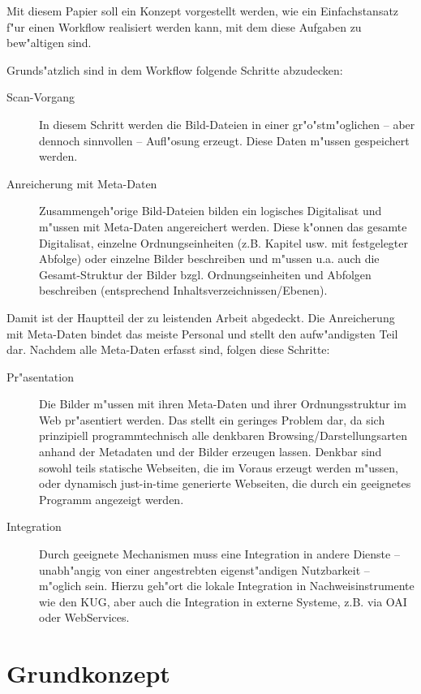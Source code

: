 \documentclass[11pt, twoside, a4paper, BCOR8mm, DIV12, bibtotoc,idxtotoc]{scrreprt}
\begin{document}
Mit diesem Papier soll ein Konzept vorgestellt werden, wie ein
Einfachstansatz f"ur einen Workflow realisiert werden kann, mit dem
diese Aufgaben zu bew"altigen sind.

Grunds"atzlich sind in dem Workflow folgende Schritte abzudecken:
\begin{description}
\item[Scan-Vorgang] In diesem Schritt werden die
  Bild-Dateien in einer gr"o"stm"oglichen -- aber dennoch sinnvollen
  -- Aufl"osung erzeugt. Diese Daten m"ussen gespeichert werden.
\item[Anreicherung mit Meta-Daten] Zusammengeh"orige Bild-Dateien
  bilden ein logisches Digitalisat und m"ussen mit Meta-Daten
  angereichert werden.  Diese k"onnen das gesamte Digitalisat,
  einzelne Ordnungs\-einheiten (z.B. Kapitel usw. mit festgelegter
  Abfolge) oder einzelne Bilder beschreiben und m"ussen u.a. auch die
  Gesamt-Struktur der Bilder bzgl.  Ordnungseinheiten und Abfolgen
  beschreiben (entsprechend Inhaltsverzeichnissen/Ebe\-nen).
\end{description}

Damit ist der Hauptteil der zu leistenden Arbeit abgedeckt. Die
Anreicherung mit Meta-Daten bindet das meiste Personal und stellt den
aufw"andigsten Teil dar. Nachdem alle Meta-Daten erfasst sind, folgen
diese Schritte:
\begin{description}
\item[Pr"asentation] Die Bilder m"ussen mit ihren Meta-Daten und ihrer
  Ordnungsstruktur im Web pr"asentiert werden. Das stellt ein geringes
  Problem dar, da sich prinzipiell programm\-tech\-nisch alle denkbaren
  Browsing/Darstellungsarten anhand der Metadaten und der Bilder
  erzeugen lassen. Denkbar sind sowohl teils statische Webseiten, die
  im Voraus erzeugt werden m"ussen, oder dynamisch just-in-time
  generierte Webseiten, die durch ein geeignetes Programm angezeigt
  werden.
\item[Integration] Durch geeignete Mechanismen muss eine Integration
  in andere Dienste -- unabh"angig von einer angestrebten
  eigenst"andigen Nutzbarkeit -- m"oglich sein. Hierzu geh"ort die
  lokale Integration in Nachweisinstrumente wie den KUG, aber auch die
  Integration in externe Systeme, z.B. via OAI oder WebServices.
\end{description}

\chapter{Grundkonzept}
\end{document}
